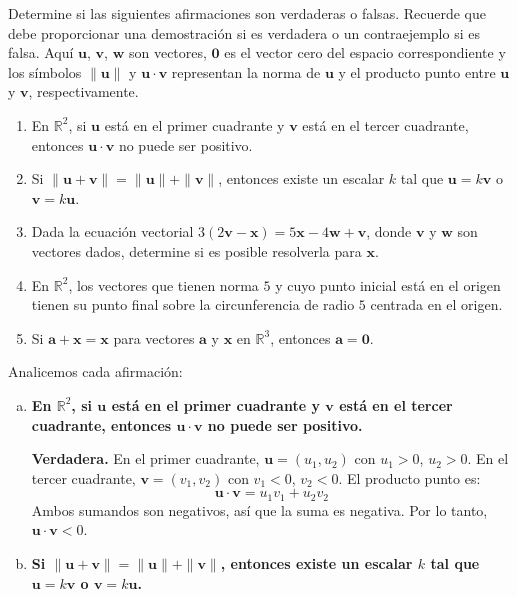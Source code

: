 \begin{prob} Determine si las siguientes afirmaciones son verdaderas o falsas. Recuerde que debe proporcionar una demostración si es verdadera o un contraejemplo si es falsa. Aquí $\mathbf{u}$, $\mathbf{v}$, $\mathbf{w}$ son vectores, $\mathbf{0}$ es el vector cero del espacio correspondiente y los símbolos $\|\mathbf{u}\|$ y $\mathbf{u} \cdot \mathbf{v}$ representan la norma de $\mathbf{u}$ y el producto punto entre $\mathbf{u}$ y $\mathbf{v}$, respectivamente.
\begin{enumerate}[$a)$]
 \item En $\mathbb{R}^2$, si $\mathbf{u}$ está en el primer cuadrante y $\mathbf{v}$ está en el tercer cuadrante, entonces $\mathbf{u} \cdot \mathbf{v}$ no puede ser positivo.
\item Si $\|\mathbf{u}+\mathbf{v}\|=\|\mathbf{u}\|+\|\mathbf{v}\|$, entonces existe un escalar $k$ tal que $\mathbf{u}=k\mathbf{v}$ o $\mathbf{v}=k\mathbf{u}$.
\item Dada la ecuación vectorial $3(2\mathbf{v}-\mathbf{x})=5\mathbf{x}-4\mathbf{w}+\mathbf{v}$, donde $\mathbf{v}$ y $\mathbf{w}$ son vectores dados, determine si es posible resolverla para $\mathbf{x}$.
\item En $\mathbb{R}^2$, los vectores que tienen norma $5$ y cuyo punto inicial está en el origen tienen su punto final sobre la circunferencia de radio $5$ centrada en el origen.
\item Si $\mathbf{a}+\mathbf{x}=\mathbf{x}$ para vectores $\mathbf{a}$ y $\mathbf{x}$ en $\mathbb{R}^3$, entonces $\mathbf{a}=\mathbf{0}$.
\end{enumerate}
\begin{myproof}
Analicemos cada afirmación:

\begin{enumerate}[a)]
\item \textbf{En $\mathbb{R}^2$, si $\mathbf{u}$ está en el primer cuadrante y $\mathbf{v}$ está en el tercer cuadrante, entonces $\mathbf{u} \cdot \mathbf{v}$ no puede ser positivo.}

\textbf{Verdadera.}  
En el primer cuadrante, $\mathbf{u} = (u_1, u_2)$ con $u_1 > 0$, $u_2 > 0$.  
En el tercer cuadrante, $\mathbf{v} = (v_1, v_2)$ con $v_1 < 0$, $v_2 < 0$.  
El producto punto es:
\[
\mathbf{u} \cdot \mathbf{v} = u_1 v_1 + u_2 v_2
\]
Ambos sumandos son negativos, así que la suma es negativa.  
Por lo tanto, $\mathbf{u} \cdot \mathbf{v} < 0$.


\item \textbf{Si $\|\mathbf{u}+\mathbf{v}\|=\|\mathbf{u}\|+\|\mathbf{v}\|$, entonces existe un escalar $k$ tal que $\mathbf{u}=k\mathbf{v}$ o $\mathbf{v}=k\mathbf{u}$.}


\end{enumerate}
\end{myproof}
\end{prob}
